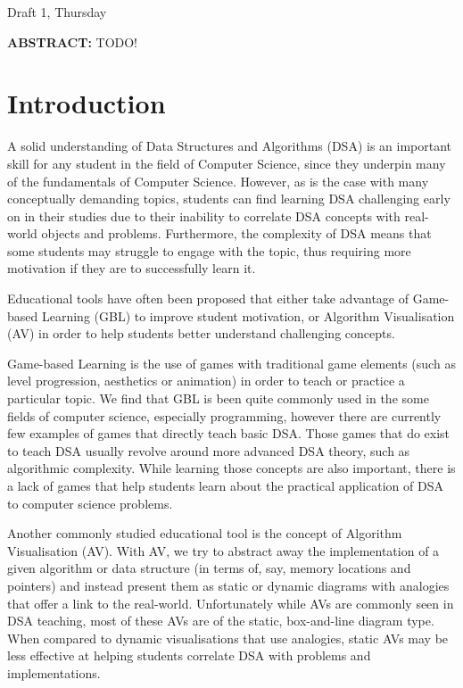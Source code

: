 \documentclass[10pt]{article}
\begin{document}
Draft 1, Thursday

\noindent \textbf{ABSTRACT:} TODO!

\section{Introduction}
A solid understanding of Data Structures and Algorithms (DSA) is an important skill for any student in the field of Computer Science, since they underpin many of the fundamentals of Computer Science. However, as is the case with many conceptually demanding topics, students can find learning DSA challenging early on in their studies due to their inability to correlate DSA concepts with real-world objects and problems\cite{7600449}. Furthermore, the complexity of DSA means that some students may struggle to engage with the topic, thus requiring more motivation if they are to successfully learn it.\par
Educational tools have often been proposed that either take advantage of Game-based Learning (GBL) to improve student motivation, or Algorithm Visualisation (AV) in order to help students better understand challenging concepts.\par
Game-based Learning is the use of games with traditional game elements (such as level progression, aesthetics or animation) in order to teach or practice a particular topic\cite{GBLTeaching}. We find that GBL is been quite commonly used in the some fields of computer science, especially programming, however there are currently few examples of games that directly teach basic DSA. Those games that do exist to teach DSA usually revolve around more advanced DSA theory, such as algorithmic complexity. While learning those concepts are also important, there is a lack of games that help students learn about the practical application of DSA to computer science problems.\par
Another commonly studied educational tool is the concept of Algorithm Visualisation (AV). With AV, we try to abstract away the implementation of a given algorithm or data structure (in terms of, say, memory locations and pointers) and instead present them as static or dynamic diagrams with analogies that offer a link to the real-world. Unfortunately while AVs are commonly seen in DSA teaching, most of these AVs are of the static, box-and-line diagram type\cite{Esponda-Arguero:2010:TVD:1827707.1827710}. When compared to dynamic visualisations that use analogies, static AVs may be less effective at helping students correlate DSA with problems and implementations.\par
\end{document}
